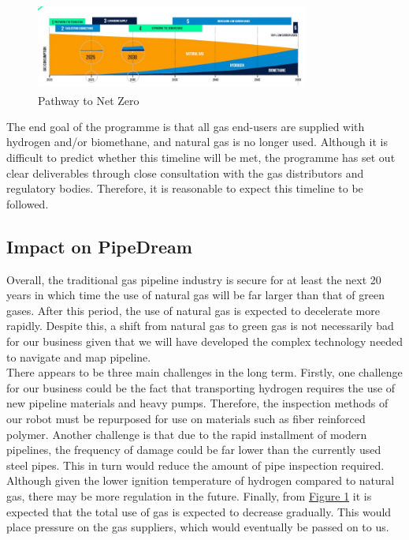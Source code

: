 \documentclass[11pt]{article}		%
\newcommand{\supercite}[1]{\textsuperscript{\cite{#1}}}		%
\newcommand{\figref}[1]{\hyperref[#1]{Figure \ref*{#1}}}    %
\begin{document}
    		\begin{figure}[h]
    			\centering
    			\includegraphics[width = 0.8\textwidth]{futureforecaset.jpg}
    			\caption{Pathway to Net Zero \supercite{gasgoesgreen} }	
    			\label{forecast}
    		\end{figure}
    		
    		The end goal of the programme is that all gas end-users are supplied with hydrogen and/or biomethane, and natural gas is no longer used. Although it is difficult to predict whether this timeline will be met, the programme has set out clear deliverables through close consultation with the gas distributors and regulatory bodies. Therefore, it is reasonable to expect this timeline to be followed. 
    
    		
    		\subsection[Impact on PipeDream]{Impact on PipeDream}
    		Overall, the traditional gas pipeline industry is secure for at least the next 20 years in which time the use of natural gas will be far larger than that of green gases. After this period, the use of natural gas is expected to decelerate more rapidly. Despite this, a shift from natural gas to green gas is not necessarily bad for our business given that we will have developed the complex technology needed to navigate and map pipeline. \\
    	    \hspace*{3ex}There appears to be three main challenges in the long term. Firstly, one challenge for our business could be the fact that transporting hydrogen requires the use of new pipeline materials and heavy pumps. Therefore, the inspection methods of our robot must be repurposed for use on materials such as fiber reinforced polymer. Another challenge is that due to the rapid installment of modern pipelines, the frequency of damage could be far lower than the currently used steel pipes. This in turn would reduce the amount of pipe inspection required. Although given the lower ignition temperature of hydrogen compared to natural gas, there may be more regulation in the future. Finally, from \figref{forecast} it is expected that the total use of gas is expected to decrease gradually. This would place pressure on the gas suppliers, which would eventually be passed on to us. 
\end{document}
